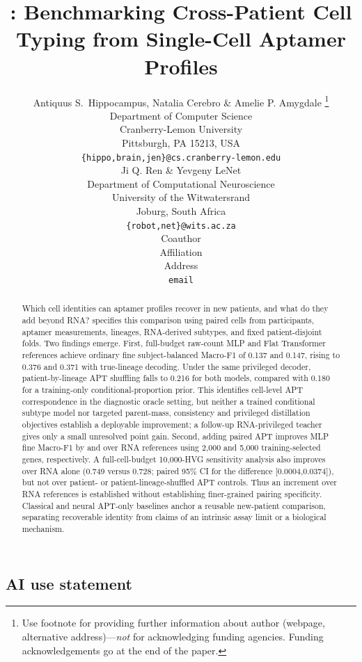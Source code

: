 \documentclass{article} %
\title{\ourbench{}: Benchmarking Cross-Patient Cell Typing from
\mbox{Single-Cell} Aptamer Profiles}
\author{Antiquus S.~Hippocampus, Natalia Cerebro \& Amelie P. Amygdale \thanks{ Use footnote for providing further information
about author (webpage, alternative address)---\emph{not} for acknowledging
funding agencies.  Funding acknowledgements go at the end of the paper.} \\
Department of Computer Science\\
Cranberry-Lemon University\\
Pittsburgh, PA 15213, USA \\
\texttt{\{hippo,brain,jen\}@cs.cranberry-lemon.edu} \\
\And
Ji Q. Ren \& Yevgeny LeNet \\
Department of Computational Neuroscience \\
University of the Witwatersrand \\
Joburg, South Africa \\
\texttt{\{robot,net\}@wits.ac.za} \\
\AND
Coauthor \\
Affiliation \\
Address \\
\texttt{email}
}
\begin{document}
\raggedbottom


\maketitle

\begin{abstract}
Which cell identities can aptamer profiles recover in new patients, and what
do they add beyond RNA? \ourbench{} specifies this comparison using \numcells{}
paired cells from \numparticipants{} participants, \numaptfeatures{} aptamer measurements, \numlineages{} lineages,
\numsubtypes{} RNA-derived subtypes, and fixed patient-disjoint folds. Two findings emerge.
First, full-budget raw-count MLP and Flat Transformer references achieve ordinary fine
subject-balanced Macro-F1 of 0.137 and 0.147, rising to 0.376 and 0.371
with true-lineage decoding. Under the same privileged decoder, patient-by-lineage
APT shuffling falls to 0.216 for both models, compared with 0.180 for a
training-only conditional-proportion prior. This identifies cell-level APT
correspondence in the diagnostic oracle setting, but neither a trained
conditional subtype model nor targeted parent-mass, consistency and privileged
distillation objectives establish a deployable improvement; a follow-up
RNA-privileged teacher gives only a small unresolved point gain. Second,
adding paired APT improves MLP fine Macro-F1 by
\pairedMLPGainTwoK{} and \pairedMLPGainFiveK{} over RNA references using 2{,}000 and 5{,}000 training-selected
genes, respectively. A full-cell-budget 10{,}000-HVG sensitivity analysis also
improves over RNA alone (0.749 versus 0.728; paired 95\% CI for the difference
[0.0004,0.0374]), but not over patient- or patient-lineage-shuffled APT
controls. Thus an increment over RNA references is established without
establishing finer-grained pairing specificity. Classical and neural APT-only
baselines anchor a reusable new-patient comparison, separating recoverable
identity from claims of an intrinsic assay limit or a biological mechanism.
\end{abstract}














\subsection*{AI use statement}
\end{document}
